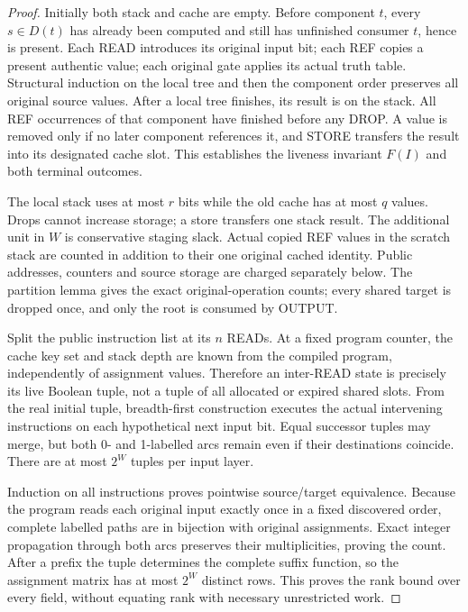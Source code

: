 \documentclass[11pt]{article}
\begin{document}
\begin{proof}
Initially both stack and cache are empty. Before component $t$, every $s\in D(t)$ has already been computed and still has unfinished consumer $t$, hence is present. Each READ introduces its original input bit; each REF copies a present authentic value; each original gate applies its actual truth table. Structural induction on the local tree and then the component order preserves all original source values. After a local tree finishes, its result is on the stack. All REF occurrences of that component have finished before any DROP. A value is removed only if no later component references it, and STORE transfers the result into its designated cache slot. This establishes the liveness invariant $F(I)$ and both terminal outcomes.

The local stack uses at most $r$ bits while the old cache has at most $q$ values. Drops cannot increase storage; a store transfers one stack result. The additional unit in $W$ is conservative staging slack. Actual copied REF values in the scratch stack are counted in addition to their one original cached identity. Public addresses, counters and source storage are charged separately below. The partition lemma gives the exact original-operation counts; every shared target is dropped once, and only the root is consumed by OUTPUT.

Split the public instruction list at its $n$ READs. At a fixed program counter, the cache key set and stack depth are known from the compiled program, independently of assignment values. Therefore an inter-READ state is precisely its live Boolean tuple, not a tuple of all allocated or expired shared slots. From the real initial tuple, breadth-first construction executes the actual intervening instructions on each hypothetical next input bit. Equal successor tuples may merge, but both 0- and 1-labelled arcs remain even if their destinations coincide. There are at most $2^W$ tuples per input layer.

Induction on all instructions proves pointwise source/target equivalence. Because the program reads each original input exactly once in a fixed discovered order, complete labelled paths are in bijection with original assignments. Exact integer propagation through both arcs preserves their multiplicities, proving the count. After a prefix the tuple determines the complete suffix function, so the assignment matrix has at most $2^W$ distinct rows. This proves the rank bound over every field, without equating rank with necessary unrestricted work.
\end{proof}
\end{document}
